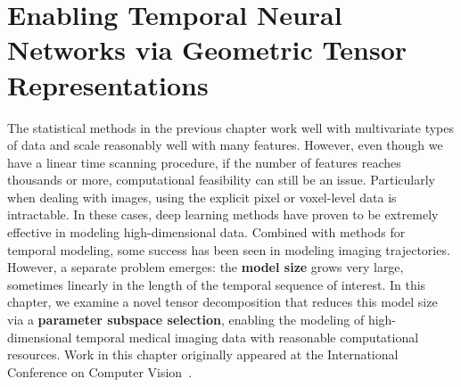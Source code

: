 \chapter{Enabling Temporal Neural Networks via Geometric Tensor Representations} \label{chap:ott} 
The statistical methods in the previous chapter work well with
multivariate types of data and scale reasonably well with many features.
However,
even though we have a linear time scanning procedure,
if the number of features reaches thousands or more,
computational feasibility can still be an issue.
Particularly when dealing with
images,
using the explicit pixel or voxel-level
data is intractable.
In these cases,
deep learning methods have
proven to be extremely effective
in modeling high-dimensional data.
Combined with methods
for temporal modeling,
some success has been seen
in modeling imaging trajectories.
However, a separate problem
emerges: the \textbf{model size}
grows very large, sometimes linearly 
in the length of the temporal sequence of interest.
In this chapter, we examine
a novel tensor decomposition
that reduces this model size via a \textbf{parameter subspace selection},
enabling the modeling of high-dimensional
temporal medical imaging data
with reasonable computational resources.
Work in this chapter originally appeared at
the International Conference on Computer Vision~\citep{ott}.



%



